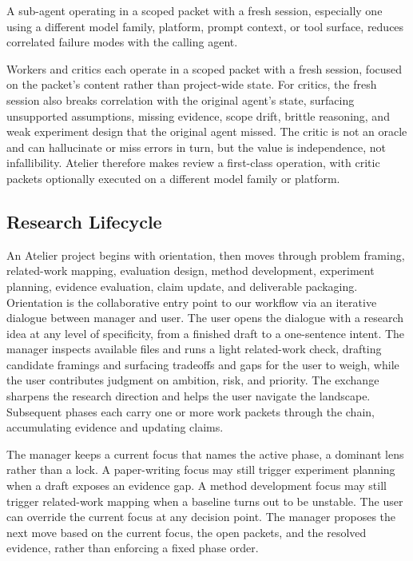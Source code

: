 \begin{assumption}
\label{assumption:sub-agent-independence}
A sub-agent operating in a scoped packet with a fresh session, especially one using a different model family, platform, prompt context, or tool surface, reduces correlated failure modes with the calling agent.
\end{assumption}

Workers and critics each operate in a scoped packet with a fresh session, focused on the packet's content rather than project-wide state. For critics, the fresh session also breaks correlation with the original agent's state, surfacing unsupported assumptions, missing evidence, scope drift, brittle reasoning, and weak experiment design that the original agent missed. The critic is not an oracle and can hallucinate or miss errors in turn, but the value is independence, not infallibility. Atelier therefore makes review a first-class operation, with critic packets optionally executed on a different model family or platform.

\subsection{Research Lifecycle}

An Atelier project begins with orientation, then moves through problem framing, related-work mapping, evaluation design, method development, experiment planning, evidence evaluation, claim update, and deliverable packaging. Orientation is the collaborative entry point to our workflow via an iterative dialogue between manager and user. The user opens the dialogue with a research idea at any level of specificity, from a finished draft to a one-sentence intent. The manager inspects available files and runs a light related-work check, drafting candidate framings and surfacing tradeoffs and gaps for the user to weigh, while the user contributes judgment on ambition, risk, and priority. The exchange sharpens the research direction and helps the user navigate the landscape. Subsequent phases each carry one or more work packets through the chain, accumulating evidence and updating claims.

The manager keeps a current focus that names the active phase, a dominant lens rather than a lock. A paper-writing focus may still trigger experiment planning when a draft exposes an evidence gap. A method development focus may still trigger related-work mapping when a baseline turns out to be unstable. The user can override the current focus at any decision point. The manager proposes the next move based on the current focus, the open packets, and the resolved evidence, rather than enforcing a fixed phase order.

